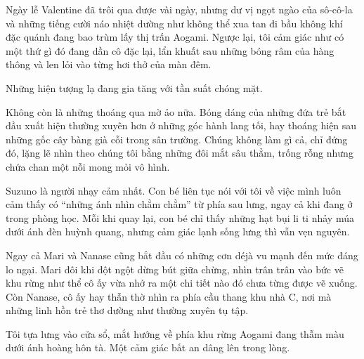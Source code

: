 \documentclass[../main.tex]{subfiles}
\begin{document}


Ngày lễ Valentine đã trôi qua được vài ngày, nhưng dư vị ngọt ngào của sô-cô-la và những tiếng cười náo nhiệt dường như không thể xua tan đi bầu không khí đặc quánh đang bao trùm lấy thị trấn Aogami. Ngược lại, tôi cảm giác như có một thứ gì đó đang dần cô đặc lại, lẩn khuất sau những bóng râm của hàng thông và len lỏi vào từng hơi thở của màn đêm.

Những hiện tượng lạ đang gia tăng với tần suất chóng mặt.

Không còn là những thoáng qua mờ ảo nữa. Bóng dáng của những đứa trẻ bắt đầu xuất hiện thường xuyên hơn ở những góc hành lang tối, hay thoáng hiện sau những gốc cây bàng già cỗi trong sân trường. Chúng không làm gì cả, chỉ đứng đó, lặng lẽ nhìn theo chúng tôi bằng những đôi mắt sâu thẳm, trống rỗng nhưng chứa chan một nỗi mong mỏi vô hình.

Suzuno là người nhạy cảm nhất. Con bé liên tục nói với tôi về việc mình luôn cảm thấy có ``những ánh nhìn chằm chằm'' từ phía sau lưng, ngay cả khi đang ở trong phòng học. Mỗi khi quay lại, con bé chỉ thấy những hạt bụi li ti nhảy múa dưới ánh đèn huỳnh quang, nhưng cảm giác lạnh sống lưng thì vẫn vẹn nguyên.

Ngay cả Mari và Nanase cũng bắt đầu có những cơn déjà vu mạnh đến mức đáng lo ngại. Mari đôi khi đột ngột dừng bút giữa chừng, nhìn trân trân vào bức vẽ khu rừng như thể cô ấy vừa nhớ ra một chi tiết nào đó chưa từng được vẽ xuống. Còn Nanase, cô ấy hay thẫn thờ nhìn ra phía cầu thang khu nhà C, nơi mà những linh hồn trẻ thơ dường như thường xuyên tụ tập.

Tôi tựa lưng vào cửa sổ, mắt hướng về phía khu rừng Aogami đang thẫm màu dưới ánh hoàng hôn tà. Một cảm giác bất an dâng lên trong lòng.
\end{document}

